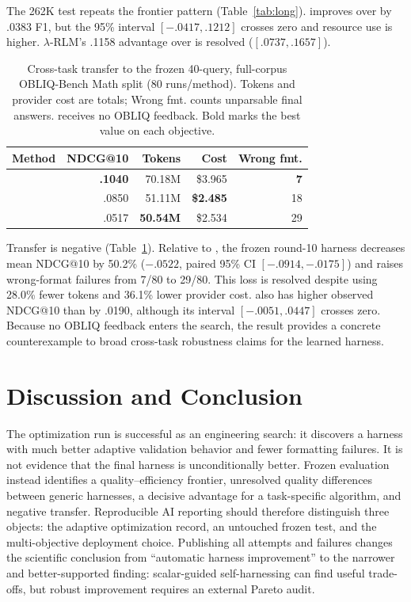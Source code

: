 The 262K test repeats the frontier pattern (Table~\ref{tab:long}). \shrlm{}
improves over \hzerostar{} by .0383 F1, but the 95\% interval
$[-.0417,.1212]$ crosses zero and resource use is higher. $\lambda$-RLM's
.1158 advantage over \shrlm{} is resolved ($[.0737,.1657]$).

\begin{table}[ht]
\centering\scriptsize
\setlength{\tabcolsep}{3.5pt}
\begin{tabular}{@{}lrrrr@{}}
\toprule
Method & NDCG@10 & Tokens & Cost & Wrong fmt. \\
\midrule
\hzerostar{} & \textbf{.1040} & 70.18M & \$3.965 & \textbf{7} \\
\hzero{} & .0850 & 51.11M & \textbf{\$2.485} & 18 \\
\shrlm{} & .0517 & \textbf{50.54M} & \$2.534 & 29 \\
\bottomrule
\end{tabular}
\caption{Cross-task transfer to the frozen 40-query, full-corpus OBLIQ-Bench
Math split (80 runs/method). Tokens and provider cost are totals; Wrong fmt.
counts unparsable final answers. \shrlm{} receives no OBLIQ feedback. Bold
marks the best value on each objective.}
\label{tab:obliq-transfer}
\end{table}

Transfer is negative (Table~\ref{tab:obliq-transfer}). Relative to
\hzerostar{}, the frozen round-10 harness decreases mean NDCG@10 by 50.2\%
($-.0522$, paired 95\% CI $[-.0914,-.0175]$) and raises wrong-format failures
from 7/80 to 29/80. This loss is resolved despite \shrlm{} using 28.0\% fewer
tokens and 36.1\% lower provider cost. \hzerostar{} also has higher observed
NDCG@10 than \hzero{} by .0190, although its interval
$[-.0051,.0447]$ crosses zero. Because no OBLIQ feedback enters the search,
the result provides a concrete counterexample to broad cross-task robustness
claims for the learned harness.

\section{Discussion and Conclusion}

The optimization run is successful as an engineering search: it discovers a
harness with much better adaptive validation behavior and fewer formatting
failures. It is not evidence that the final harness is unconditionally better.
Frozen evaluation instead identifies a quality--efficiency frontier, unresolved
quality differences between generic harnesses, a decisive advantage for a
task-specific algorithm, and negative transfer. Reproducible AI reporting should
therefore distinguish three objects: the adaptive optimization record, an
untouched frozen test, and the multi-objective deployment choice. Publishing all
attempts and failures changes the scientific conclusion from ``automatic harness
improvement'' to the narrower and better-supported finding: scalar-guided
self-harnessing can find useful trade-offs, but robust improvement requires an
external Pareto audit.

